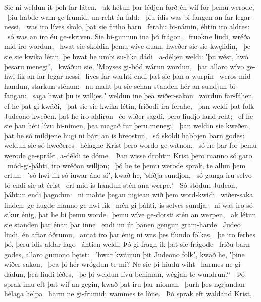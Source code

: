 Sie ni weldun it þoh far-láten, \hld\ ak hétun þar lédjen forð
én wíf for þemu werode, \hld\ þiu habde wam ge-frumid,
un-reht én-fald: \hld\ þiu idis was bi-fangen
an far-legar-nessi, \hld\ was iro líves skolo,
þat sie firiho barn \hld\ ferahu bi-námin,
éhtin iro aldres: \hld\ só was an iro éu ge-skriven.
Sie bi-gunnun ina þó frágon, \hld\ fruokne liudi,
wréða mid iro wordun, \hld\ hwat sie skoldin þemu wíve duan,
hweðer sie sie kwęlidin, \hld\ þe sie sie kwika létin,
þe hwat he umbi su-lika dádi \hld\ a-déljen weldi:
ʽþu wést, hwó þesaru menegiʼ, \hld\ kwáðun sie, ʽMoyses gi-bód
wárun wordun, \hld\ þat allaro wívo ge-hwi-lik
an far-legar-nessi \hld\ líves far-warhti
endi þat sie þan a-wurpin \hld\ weros mid handun,
starkun sténun: \hld\ nu maht þu sie sehan standen hér
an sundjun bi-fangan: \hld\ saga hwat þu is willjes.ʼ
weldun ine þea wiðer-sakon \hld\ wordun far-fáhen,
ef he þat gi-kwáði, \hld\ þat sie sie kwika létin,
friðodi ira ferahe, \hld\ þan weldi þat folk Judeono
kweðen, þat he iro aldiron \hld\ éo wiðer-sagdi,
þero liudjo land-reht; \hld\ ef he sie þan héti lívu bi-nimen,
þea magað fur þeru menegi, \hld\ þan weldin sie kweðen, þat he só mildjene hugi
ni bári an is breostun, \hld\ só skoldi habbjen barn godes:
weldun sie só hweðeres \hld\ hèlagne Krist
þero wordo ge-wítnon, \hld\ só he þar for þemu werode ge-spráki,
a-déldi te dóme. \hld\ Þan wisse drohtin Krist
þero manno só garo \hld\ mód-gi-þáhti,
iro wréðon willjon; \hld\ þó he te þemu werode sprak,
te allun þem erlun: \hld\ ʽsó hwi-lik só iuwar áno síʼ, kwað he,
ʽslíðja sundjon, \hld\ só ganga iru selvo tó
endi sie at érist \hld\ erl mid is handun
stén ana werpe.ʼ \hld\ Só stódun Judeon,
þáhtun endi þagodun: \hld\ ni mahte þegan nigiean
wið þem word-kwidi \hld\ wiðer-saka finden:
ge-hugde manno ge-hwi-lik \hld\ mén-gi-þáhti,
is selves sundja: \hld\ ni was iro só sikur énig,
þat he bi þemu worde \hld\ þemu wíve ge-dorsti
stén an werpen, \hld\ ak létun sie standen þar
énan þar inne \hld\ endi im út þanen
gengun gram-harde \hld\ Judeo liudi,
én aftar óðrumu, \hld\ antat iro þar énig ni was
þes fíundo folkes, \hld\ þe iro ferhes þó,
þeru idis aldar-lago \hld\ áhtien weldi.
Þó gi-fragn ik þat sie frágode \hld\ friðu-barn godes,
allaro gumono bętst: \hld\ ʽhwar kwámun þit Judeono folkʼ, kwað he,
ʽþine wiðer-sakon, \hld\ þea þi hér wrógdun te mi?
Ne sie þi hiudu wiht \hld\ harmes ne gi-dádun,
þea liudi léðes, \hld\ þe þi weldun lívu beniman,
wégjan te wundrun?ʼ \hld\ Þó sprak imu eft þat wíf an-gegin,
kwað þat iru þar nioman \hld\ þurh þes nęrjandan
hèlaga helpa \hld\ harm ne gi-frumidi
wammes te lòne. \hld\ Þó sprak eft waldand Krist,
